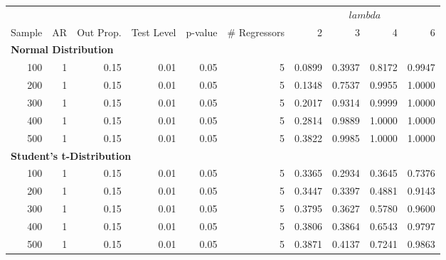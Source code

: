 \begin{table}
\centering
\begin{tabular}{r|r|r|r|r|r|r|r|r|r}
\hline
\multicolumn{6}{c|}{ } & \multicolumn{4}{c}{$lambda$} \\
\cline{7-10}
Sample & AR & Out Prop. & Test Level & p-value & \# Regressors & 2 & 3 & 4 & 6\\
\hline
\multicolumn{10}{l}{\textbf{Normal Distribution}}\\
\hline
\hspace{1em}100 & 1 & 0.15 & 0.01 & 0.05 & 5 & 0.0899 & 0.3937 & 0.8172 & 0.9947\\
\hline
\hspace{1em}200 & 1 & 0.15 & 0.01 & 0.05 & 5 & 0.1348 & 0.7537 & 0.9955 & 1.0000\\
\hline
\hspace{1em}300 & 1 & 0.15 & 0.01 & 0.05 & 5 & 0.2017 & 0.9314 & 0.9999 & 1.0000\\
\hline
\hspace{1em}400 & 1 & 0.15 & 0.01 & 0.05 & 5 & 0.2814 & 0.9889 & 1.0000 & 1.0000\\
\hline
\hspace{1em}500 & 1 & 0.15 & 0.01 & 0.05 & 5 & 0.3822 & 0.9985 & 1.0000 & 1.0000\\
\hline
\multicolumn{10}{l}{\textbf{Student's t-Distribution}}\\
\hline
\hspace{1em}100 & 1 & 0.15 & 0.01 & 0.05 & 5 & 0.3365 & 0.2934 & 0.3645 & 0.7376\\
\hline
\hspace{1em}200 & 1 & 0.15 & 0.01 & 0.05 & 5 & 0.3447 & 0.3397 & 0.4881 & 0.9143\\
\hline
\hspace{1em}300 & 1 & 0.15 & 0.01 & 0.05 & 5 & 0.3795 & 0.3627 & 0.5780 & 0.9600\\
\hline
\hspace{1em}400 & 1 & 0.15 & 0.01 & 0.05 & 5 & 0.3806 & 0.3864 & 0.6543 & 0.9797\\
\hline
\hspace{1em}500 & 1 & 0.15 & 0.01 & 0.05 & 5 & 0.3871 & 0.4137 & 0.7241 & 0.9863\\
\hline
\end{tabular}
\end{table}
